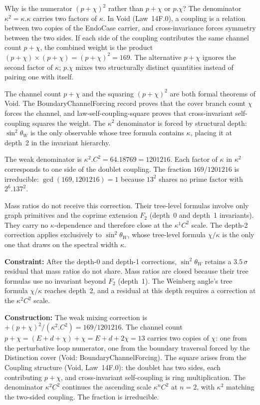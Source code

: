 \documentclass[11pt,a4paper]{book}
\def\cdot{.}%
\def\texttt#1{#1}%
\begin{document}
Why is the numerator $(p + \chi)^2$ rather than $p + \chi$ or
$p \cdot \chi$?  The denominator $\kappa^2 = \kappa \cdot \kappa$
carries two factors of $\kappa$.  In Void (Law~14F.0), a coupling
is a relation between two copies of the EndoCase carrier, and
cross-invariance forces symmetry between the two sides.  If each
side of the coupling contributes the same channel count $p + \chi$,
the combined weight is the product $(p + \chi) \times (p + \chi)
= (p + \chi)^2 = 169$.  The alternative $p + \chi$ ignores the
second factor of $\kappa$; $p \cdot \chi$ mixes two structurally
distinct quantities instead of pairing one with itself.

The channel count $p + \chi$ and the squaring $(p + \chi)^2$ are
both formal theorems of Void.  The \texttt{BoundaryChannelForcing}
record proves that the cover branch count $\chi$ forces the
channel, and \texttt{law-self-coupling-square} proves that
cross-invariant self-coupling squares the weight.  The $\kappa^2$
denominator is forced by structural depth: $\sin^2\!\theta_W$ is
the only observable whose tree formula contains $\kappa$, placing
it at depth~2 in the invariant hierarchy.

The weak denominator is $\kappa^2 \cdot C^2 = 64 \cdot 18769 = 1201216$.
Each factor of $\kappa$ in $\kappa^2$ corresponds to one side of the
doublet coupling.  The fraction $169/1201216$ is irreducible:
$\gcd(169, 1201216) = 1$ because $13^2$ shares no prime factor with
$2^6 \cdot 137^2$.

Mass ratios do not receive this correction.  Their tree-level
formulas involve only graph primitives and the coprime extension $F_2$
(depth~0 and depth~1 invariants).  They carry no $\kappa$-dependence
and therefore close at the $\kappa^1 C^2$ scale.  The depth-2
correction applies exclusively to $\sin^2\!\theta_W$, whose
tree-level formula $\chi/\kappa$ is the only one that draws on
the spectral width $\kappa$.

\medskip
\noindent
\textbf{Constraint:}
After the depth-0 and depth-1 corrections,
$\sin^2\!\theta_W$ retains a $3.5\,\sigma$ residual that mass ratios
do not share.  Mass ratios are closed because their tree formulas
use no invariant beyond $F_2$ (depth~1).  The Weinberg angle's tree
formula $\chi/\kappa$ reaches depth~2, and a residual at this depth
requires a correction at the $\kappa^2 C^2$ scale.

\medskip
\noindent
\textbf{Construction:}
The weak mixing correction is
$+(p + \chi)^2/(\kappa^2 \cdot C^2) = 169/1201216$.
The channel count $p + \chi = (E + d + \chi) + \chi = E + d + 2\chi = 13$
carries two copies of $\chi$: one from the perturbative loop numerator,
one from the boundary traversal forced by the Distinction cover
(Void: \texttt{BoundaryChannelForcing}).
The square arises from the Coupling structure (Void, Law~14F.0):
the doublet has two sides, each contributing $p + \chi$, and
cross-invariant self-coupling is ring multiplication.
The denominator $\kappa^2 C^2$ continues the ascending scale $\kappa^n C^2$
at $n = 2$, with $\kappa^2$ matching the two-sided coupling.
The fraction is irreducible.
\end{document}
